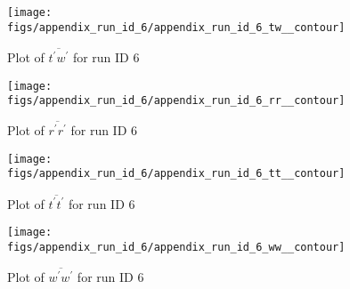 \begin{figure}[H]
\centering
\texttt{[image: figs/appendix\_run\_id\_6/appendix\_run\_id\_6\_tw\_\_contour]}
\caption{Plot of $\overline{t^\prime w^\prime}$ for run ID 6}
\label{fig:appendix_run_id_6_tw__contour}
\end{figure}


\begin{figure}[H]
\centering
\texttt{[image: figs/appendix\_run\_id\_6/appendix\_run\_id\_6\_rr\_\_contour]}
\caption{Plot of $\overline{r^\prime r^\prime}$ for run ID 6}
\label{fig:appendix_run_id_6_rr__contour}
\end{figure}


\begin{figure}[H]
\centering
\texttt{[image: figs/appendix\_run\_id\_6/appendix\_run\_id\_6\_tt\_\_contour]}
\caption{Plot of $\overline{t^\prime t^\prime}$ for run ID 6}
\label{fig:appendix_run_id_6_tt__contour}
\end{figure}


\begin{figure}[H]
\centering
\texttt{[image: figs/appendix\_run\_id\_6/appendix\_run\_id\_6\_ww\_\_contour]}
\caption{Plot of $\overline{w^\prime w^\prime}$ for run ID 6}
\label{fig:appendix_run_id_6_ww__contour}
\end{figure}


